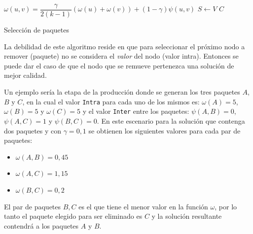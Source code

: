\begin{center}
	\begin{algorithm}[H]
	\DontPrintSemicolon
	\SetAlgoLined
		$\omega(u,v) = \dfrac{\gamma}{2( k - 1)} (\omega(u) + \omega(v)) + (1 - \gamma)\psi(u,v)$\;
		$S \leftarrow V$\;
		\Return $C$\;
	\caption{Selección de paquetes}\label{alg:chooseBundles}
	\end{algorithm}
\end{center}

La debilidad de este algoritmo reside en que para seleccionar el próximo nodo a remover (paquete) no se considera el \textit{valor} del nodo (valor intra). Entonces se puede dar el caso de que el nodo que se remueve pertenezca una solución de mejor calidad.


Un ejemplo sería la etapa de la producción donde se generan los tres paquetes $A$, $B$ y $C$, en la cual el valor \texttt{Intra} para cada uno de los mismos es: $\omega(A) = 5$, $\omega(B) = 5$ y $\omega(C) = 5$ y el valor \texttt{Inter} entre los paquetes: $\psi(A,B) = 0$, $\psi(A,C) = 1$ y $\psi(B,C) = 0$. En este escenario para la solución que contenga dos paquetes y con $\gamma=0,1$ se obtienen los siguientes valores para cada par de paquetes:
\begin{itemize}
	\item $\omega(A,B) = 0,45$
	\item $\omega(A,C) = 1,15$
	\item $\omega(B,C) = 0,2$
\end{itemize}
 
El par de paquetes $B, C$ es el que tiene el menor valor en la función $\omega$, por lo tanto el paquete elegido para ser eliminado es $C$ y la solución resultante contendrá a los paquetes $A$ y $B$. 

